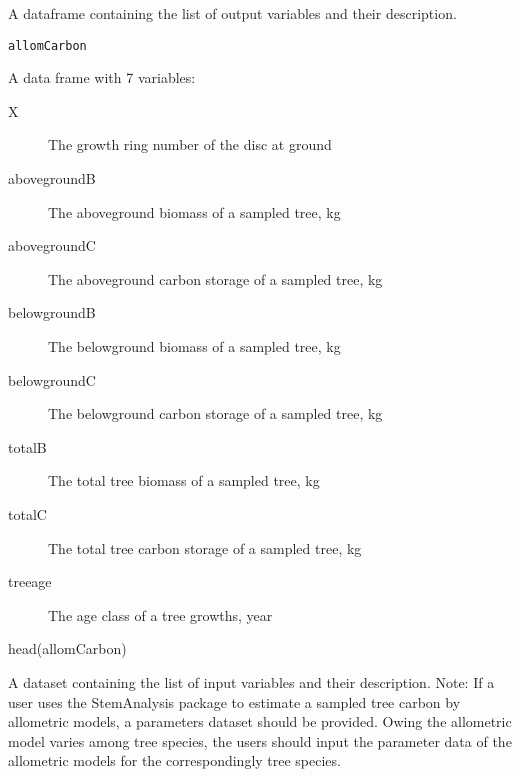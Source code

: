\documentclass[a4paper]{book}
\begin{document}
%
\begin{Description}\relax
A dataframe containing the list of output variables and their description.
\end{Description}
%
\begin{Usage}
\begin{verbatim}
allomCarbon
\end{verbatim}
\end{Usage}
%
\begin{Format}
A data frame with 7 variables:
\begin{description}

\item[X] The growth ring number of the disc at ground
\item[abovegroundB] The aboveground biomass of a sampled tree, kg
\item[abovegroundC] The aboveground carbon storage of a sampled tree, kg
\item[belowgroundB] The belowground biomass of a sampled tree, kg
\item[belowgroundC] The belowground carbon storage of a sampled tree, kg
\item[totalB] The total tree biomass of a sampled tree, kg
\item[totalC] The total tree carbon storage of a sampled tree, kg
\item[treeage] The age class of a tree growths, year

\end{description}

\end{Format}
%
\begin{Examples}
\begin{ExampleCode}
head(allomCarbon)
\end{ExampleCode}
\end{Examples}
%
\begin{Description}\relax
A dataset containing the list of input variables and their description.
Note: If a user uses the StemAnalysis package to estimate a sampled tree
carbon by allometric models, a parameters dataset should be provided.
Owing the allometric model varies among tree species, the users should
input the parameter data of the allometric models for the correspondingly
tree species.
\end{Description}
\end{document}
